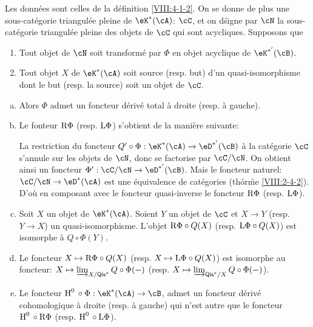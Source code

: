 \begin{theorem}\label{VIII:4-2-3} %
Les données sont celles de la définition \ref{VIII:4-1-2}. On se donne de 
plus une sous-catégorie triangulée pleine de $\eK^\ast(\cA)$: $\cC$, et on 
d\'signe par $\cN$ la sous-catégorie triangulée pleine des objets de $\cC$ 
qui sont acycliques. Supposons que 
\begin{enumerate}[(1)]
  \item Tout objet de $\cN$ soit transformé par $\Phi$ en objet acyclique 
    de $\eK^{\ast'}(\cB)$. 
  \item Tout objet $X$ de $\eK^\ast(\cA)$ soit source (resp. but) d'un 
    quasi-isomorphisme dont le but (resp. la source) soit un objet de $\cC$. 
\end{enumerate}
\begin{enumerate}[a)]
  \item Alors $\Phi$ admet un foncteur dérivé total à droite (resp. 
    à gauche). 
  \item Le fonteur $\mathrm{R} \Phi$ (resp. $\mathrm{L} \Phi$) s'obtient de la manière 
    suivante: 
    
    La restriction du foncteur 
    $Q'\circ \Phi:\eK^\ast(\cA) \to \eD^{\ast'}(\cB)$ à la catégorie $\cC$ 
    s'annule sur les objets de $\cN$, donc se factorise par $\cC/\cN$. On 
    obtient ainsi un foncteur $\Phi':\cC/\cN\to \eD^{\ast'}(\cB)$. Mais le 
    foncteur naturel: $\cC/\cN\to \eD^\ast(\cA)$ est une équivalence de 
    catégories (th\'or\`me \ref{VIII:2-4-2}). D'où en composant avec le 
    foncteur quasi-inverse le foncteur $\mathrm{R}\Phi$ (resp. $\mathrm{L} \Phi$). 
  \item Soit $X$ un objet de $\eK^\ast(\cA)$. Soient $Y$ un objet de $\cC$ et 
    $X\to Y$ (resp. $Y\to X$) un quasi-isomorphisme. L'objet 
    $\mathrm{R}\Phi\circ Q(X)$ (resp. $\mathrm{L} \Phi\circ Q(X)$) est isomorphe à 
    $Q\circ \Phi(Y)$. 
  \item Le foncteur $X\mapsto \mathrm{R}\Phi\circ Q(X)$ (resp. 
    $X\mapsto \mathrm{L} \Phi\circ Q(X)$) est isomorphe au foncteur: 
    $X\mapsto \varinjlim_{X/\mathsf{Qis}^\ast} Q\circ\Phi(-)$ (resp. 
    $X\mapsto \varinjlim_{\mathsf{Qis}^\ast/X} Q\circ \Phi(-)$). 
  \item Le foncteur $\h^0{}\circ \Phi:\eK^\ast(\cA)\to \cB$, admet un 
    foncteur dérivé cohomologique à droite (resp. à gauche) qui n'est 
    autre que le foncteur $\operatorname{H}^0{}\circ\mathrm{R}\Phi$ (resp. $\operatorname{H}^0{}\circ \mathrm{L}\Phi$). 
\end{enumerate}
\end{theorem}





